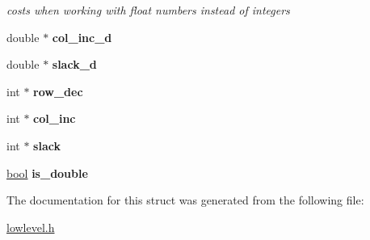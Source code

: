 \begin{DoxyCompactItemize}
\begin{DoxyCompactList}\small\item\em costs when working with float numbers instead of integers \end{DoxyCompactList}\item 
\mbox{\label{structhungarian__struct_a664fb941cbe92edac9b53b3a73ab2bcf}} 
double $\ast$ {\bfseries col\+\_\+inc\+\_\+d}
\item 
\mbox{\label{structhungarian__struct_ab950c557f9dfff879eb5ee24e6aacd02}} 
double $\ast$ {\bfseries slack\+\_\+d}
\item 
\mbox{\label{structhungarian__struct_a0800735b749c19f173bc7fcd308120a6}} 
int $\ast$ {\bfseries row\+\_\+dec}
\item 
\mbox{\label{structhungarian__struct_a935949b5feabfb7ec7328c159c7a6bb6}} 
int $\ast$ {\bfseries col\+\_\+inc}
\item 
\mbox{\label{structhungarian__struct_ae000f8eb99f06115d85943377e0bbf97}} 
int $\ast$ {\bfseries slack}
\item 
\mbox{\label{structhungarian__struct_ac1f3d3ba3885b39457c4fe89b3fc0b81}} 
\hyperlink{lowlevel_8h_a97a80ca1602ebf2303258971a2c938e2}{bool} {\bfseries is\+\_\+double}
\end{DoxyCompactItemize}


The documentation for this struct was generated from the following file\+:\begin{DoxyCompactItemize}
\item 
\hyperlink{lowlevel_8h}{lowlevel.\+h}\end{DoxyCompactItemize}
